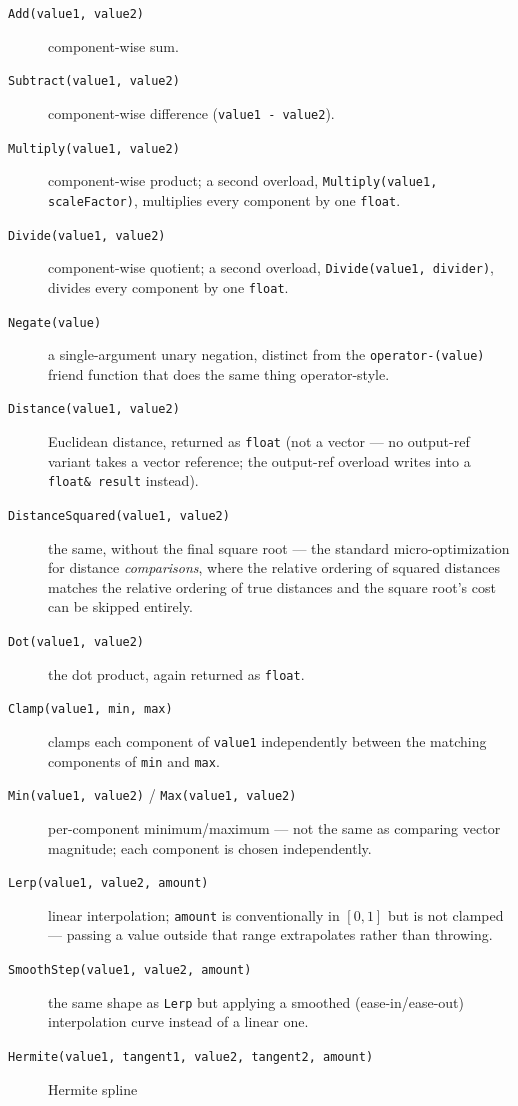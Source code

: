 \begin{description}
\item[\texttt{Add(value1, value2)}] component-wise sum.
\item[\texttt{Subtract(value1, value2)}] component-wise difference (\texttt{value1 - value2}).
\item[\texttt{Multiply(value1, value2)}] component-wise product; a second overload,
  \texttt{Multiply(value1, scaleFactor)}, multiplies every component by one \texttt{float}.
\item[\texttt{Divide(value1, value2)}] component-wise quotient; a second overload,
  \texttt{Divide(value1, divider)}, divides every component by one \texttt{float}.
\item[\texttt{Negate(value)}] a single-argument unary negation, distinct from the
  \texttt{operator-(value)} friend function that does the same thing operator-style.
\item[\texttt{Distance(value1, value2)}] Euclidean distance, returned as \texttt{float} (not a
  vector --- no output-ref variant takes a vector reference; the output-ref overload writes
  into a \texttt{float\& result} instead).
\item[\texttt{DistanceSquared(value1, value2)}] the same, without the final square root ---
  the standard micro-optimization for distance \emph{comparisons}, where the relative ordering
  of squared distances matches the relative ordering of true distances and the square root's
  cost can be skipped entirely.
\item[\texttt{Dot(value1, value2)}] the dot product, again returned as \texttt{float}.
\item[\texttt{Clamp(value1, min, max)}] clamps each component of \texttt{value1} independently
  between the matching components of \texttt{min} and \texttt{max}.
\item[\texttt{Min(value1, value2)} / \texttt{Max(value1, value2)}] per-component minimum/maximum
  --- not the same as comparing vector magnitude; each component is chosen independently.
\item[\texttt{Lerp(value1, value2, amount)}] linear interpolation; \texttt{amount} is
  conventionally in $[0,1]$ but is not clamped --- passing a value outside that range
  extrapolates rather than throwing.
\item[\texttt{SmoothStep(value1, value2, amount)}] the same shape as \texttt{Lerp} but applying
  a smoothed (ease-in/ease-out) interpolation curve instead of a linear one.
\item[\texttt{Hermite(value1, tangent1, value2, tangent2, amount)}] Hermite spline

\end{description}
